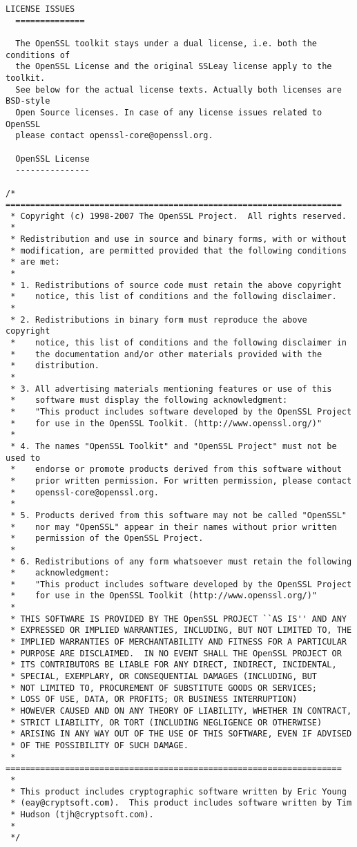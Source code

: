 \begin{lstlisting}[firstnumber=1,]
  LICENSE ISSUES
  ==============

  The OpenSSL toolkit stays under a dual license, i.e. both the conditions of
  the OpenSSL License and the original SSLeay license apply to the toolkit.
  See below for the actual license texts. Actually both licenses are BSD-style
  Open Source licenses. In case of any license issues related to OpenSSL
  please contact openssl-core@openssl.org.

  OpenSSL License
  ---------------

/* ====================================================================
 * Copyright (c) 1998-2007 The OpenSSL Project.  All rights reserved.
 *
 * Redistribution and use in source and binary forms, with or without
 * modification, are permitted provided that the following conditions
 * are met:
 *
 * 1. Redistributions of source code must retain the above copyright
 *    notice, this list of conditions and the following disclaimer.
 *
 * 2. Redistributions in binary form must reproduce the above copyright
 *    notice, this list of conditions and the following disclaimer in
 *    the documentation and/or other materials provided with the
 *    distribution.
 *
 * 3. All advertising materials mentioning features or use of this
 *    software must display the following acknowledgment:
 *    "This product includes software developed by the OpenSSL Project
 *    for use in the OpenSSL Toolkit. (http://www.openssl.org/)"
 *
 * 4. The names "OpenSSL Toolkit" and "OpenSSL Project" must not be used to
 *    endorse or promote products derived from this software without
 *    prior written permission. For written permission, please contact
 *    openssl-core@openssl.org.
 *
 * 5. Products derived from this software may not be called "OpenSSL"
 *    nor may "OpenSSL" appear in their names without prior written
 *    permission of the OpenSSL Project.
 *
 * 6. Redistributions of any form whatsoever must retain the following
 *    acknowledgment:
 *    "This product includes software developed by the OpenSSL Project
 *    for use in the OpenSSL Toolkit (http://www.openssl.org/)"
 *
 * THIS SOFTWARE IS PROVIDED BY THE OpenSSL PROJECT ``AS IS'' AND ANY
 * EXPRESSED OR IMPLIED WARRANTIES, INCLUDING, BUT NOT LIMITED TO, THE
 * IMPLIED WARRANTIES OF MERCHANTABILITY AND FITNESS FOR A PARTICULAR
 * PURPOSE ARE DISCLAIMED.  IN NO EVENT SHALL THE OpenSSL PROJECT OR
 * ITS CONTRIBUTORS BE LIABLE FOR ANY DIRECT, INDIRECT, INCIDENTAL,
 * SPECIAL, EXEMPLARY, OR CONSEQUENTIAL DAMAGES (INCLUDING, BUT
 * NOT LIMITED TO, PROCUREMENT OF SUBSTITUTE GOODS OR SERVICES;
 * LOSS OF USE, DATA, OR PROFITS; OR BUSINESS INTERRUPTION)
 * HOWEVER CAUSED AND ON ANY THEORY OF LIABILITY, WHETHER IN CONTRACT,
 * STRICT LIABILITY, OR TORT (INCLUDING NEGLIGENCE OR OTHERWISE)
 * ARISING IN ANY WAY OUT OF THE USE OF THIS SOFTWARE, EVEN IF ADVISED
 * OF THE POSSIBILITY OF SUCH DAMAGE.
 * ====================================================================
 *
 * This product includes cryptographic software written by Eric Young
 * (eay@cryptsoft.com).  This product includes software written by Tim
 * Hudson (tjh@cryptsoft.com).
 *
 */


\end{lstlisting}

